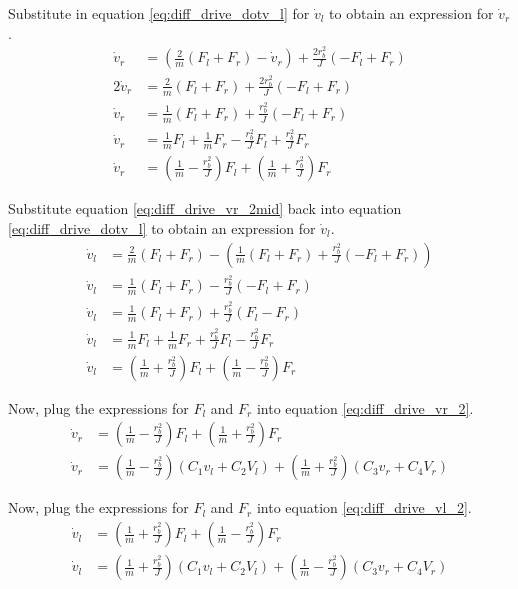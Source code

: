 Substitute in equation \eqref{eq:diff_drive_dotv_l} for $\dot{v}_l$ to obtain an
expression for $\dot{v}_r$.
\begin{align}
  \dot{v}_r &= \left(\frac{2}{m} (F_l + F_r) - \dot{v}_r\right) +
    \frac{2 r_b^2}{J} (-F_l + F_r) \nonumber \\
  2\dot{v}_r &= \frac{2}{m} (F_l + F_r) + \frac{2 r_b^2}{J} (-F_l + F_r)
    \nonumber \\
  \dot{v}_r &= \frac{1}{m} (F_l + F_r) + \frac{r_b^2}{J} (-F_l + F_r)
    \label{eq:diff_drive_vr_2mid} \\
  \dot{v}_r &= \frac{1}{m} F_l + \frac{1}{m} F_r - \frac{r_b^2}{J} F_l +
    \frac{r_b^2}{J} F_r \nonumber \\
  \dot{v}_r &= \left(\frac{1}{m} - \frac{r_b^2}{J}\right) F_l +
    \left(\frac{1}{m} + \frac{r_b^2}{J}\right) F_r \label{eq:diff_drive_vr_2}
\end{align}

Substitute equation \eqref{eq:diff_drive_vr_2mid} back into equation
\eqref{eq:diff_drive_dotv_l} to obtain an expression for $\dot{v}_l$.
\begin{align}
  \dot{v}_l &= \frac{2}{m} (F_l + F_r) - \left(\frac{1}{m} (F_l + F_r) +
    \frac{r_b^2}{J} (-F_l + F_r)\right) \nonumber \\
  \dot{v}_l &= \frac{1}{m} (F_l + F_r) - \frac{r_b^2}{J} (-F_l + F_r)
    \nonumber \\
  \dot{v}_l &= \frac{1}{m} (F_l + F_r) + \frac{r_b^2}{J} (F_l - F_r) \nonumber
    \\
  \dot{v}_l &= \frac{1}{m} F_l + \frac{1}{m} F_r + \frac{r_b^2}{J} F_l -
    \frac{r_b^2}{J} F_r \nonumber \\
  \dot{v}_l &= \left(\frac{1}{m} + \frac{r_b^2}{J}\right) F_l +
    \left(\frac{1}{m} - \frac{r_b^2}{J}\right) F_r \label{eq:diff_drive_vl_2}
\end{align}

Now, plug the expressions for $F_l$ and $F_r$ into equation
\eqref{eq:diff_drive_vr_2}.
\begin{align}
  \dot{v}_r &= \left(\frac{1}{m} - \frac{r_b^2}{J}\right) F_l +
    \left(\frac{1}{m} + \frac{r_b^2}{J}\right) F_r \nonumber \\
  \dot{v}_r &= \left(\frac{1}{m} - \frac{r_b^2}{J}\right)
    \left(C_1 v_l + C_2 V_l\right) +
    \left(\frac{1}{m} + \frac{r_b^2}{J}\right) \left(C_3 v_r + C_4 V_r\right)
    \label{eq:diff_drive_model_right}
\end{align}

Now, plug the expressions for $F_l$ and $F_r$ into equation
\eqref{eq:diff_drive_vl_2}.
\begin{align}
  \dot{v}_l &= \left(\frac{1}{m} + \frac{r_b^2}{J}\right) F_l +
    \left(\frac{1}{m} - \frac{r_b^2}{J}\right) F_r \nonumber \\
  \dot{v}_l &= \left(\frac{1}{m} + \frac{r_b^2}{J}\right)
    \left(C_1 v_l + C_2 V_l\right) +
    \left(\frac{1}{m} - \frac{r_b^2}{J}\right) \left(C_3 v_r + C_4 V_r\right)
    \label{eq:diff_drive_model_left}
\end{align}

